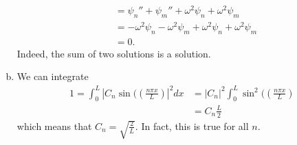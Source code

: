 \documentclass[12pt]{article} %
\begin{document}
\begin{solution}
\begin{enumerate}[(a)]
\begin{align*}
    &= \psi_n'' + \psi_m''  + \omega^2 \psi_n + \omega^2 \psi_m\\
    &= -\omega^2 \psi_n -\omega^2\psi_m+\omega^2\psi_n + \omega^2\psi_m\\
    &=0.
\end{align*}
Indeed, the sum of two solutions is a solution.
\item We can integrate
\begin{align*}
1=\int_0^L |C_n\sin(\left(\frac{n\pi x}{L}\right)|^2dx&= |C_n|^2 \int_0^L \sin^2(\left(\frac{n \pi x}{L}\right)\\
&= C_n \frac{L}{2}
\end{align*}
which means that $C_n=\sqrt{\frac{2}{L}}$. In fact, this is true for all $n$.
\end{enumerate}
\end{solution}
\end{document}
